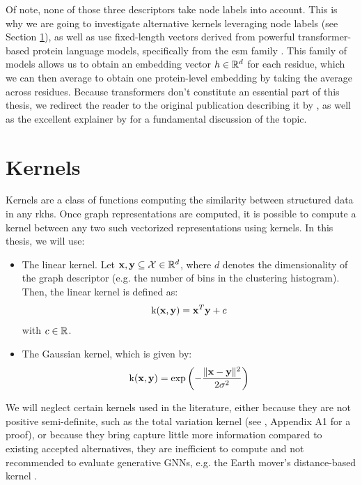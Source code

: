 Of note, none of those three descriptors take node labels into account. This is
why we are going to investigate alternative kernels leveraging node labels (see
Section \ref{sec:kernels}), as well as use fixed-length vectors derived from
powerful transformer-based protein language models, specifically from the
\acrfull{esm} family \citep{rives2021biological}. This family of models allows
us to obtain an embedding vector $h\in\mathbb{R}^d$ for each residue, which we can then
average to obtain one protein-level embedding by taking the average across
residues. Because transformers don't constitute an essential part of this
thesis, we redirect the reader to the original publication describing it by
\cite{vaswani2017attention}, as well as the excellent explainer by
\cite{alammar2018} for a fundamental discussion of the topic.

\section{Kernels}\label{sec:kernels}

Kernels are a class of functions computing the similarity between structured
data in any \acrfull{rkhs}. Once graph representations are computed, it is
possible to compute a kernel between any two such vectorized representations
using kernels. In this thesis, we will use:

\begin{itemize}
\item The linear kernel. Let $\mathbf{x},\mathbf{y}\subseteq \mathcal{X}\in\mathbb{R}^d$, where $d$
  denotes the dimensionality of the graph descriptor (e.g. the number of bins in
  the clustering histogram). Then, the linear kernel is defined as:
  \begin{equation}
    \label{eq:linear_kernel}
    \text{k}(\mathbf{x}, \mathbf{y}) = \mathbf{x}^T \mathbf{y} + c
  \end{equation}
  with $c\in\mathbb{R}$.
\item The Gaussian kernel, which is given by:
  \begin{equation}
    \label{eq:gaussian_kernel}
    \text{k}(\mathbf{x}, \mathbf{y}) = \exp\left( -{\lVert \mathbf{x}-\mathbf{y} \rVert^2\over 2\sigma^2} \right)
  \end{equation}
\end{itemize}

We will neglect certain kernels used in the literature, either because they are not
positive semi-definite, such as the total variation kernel (see
\cite{o2021evaluation}, Appendix A1 for a proof), or because they bring capture
little more information compared to existing accepted alternatives, they are
inefficient to compute and not recommended to evaluate generative GNNs, e.g. the
Earth mover's distance-based kernel \citep{o2021evaluation}.

